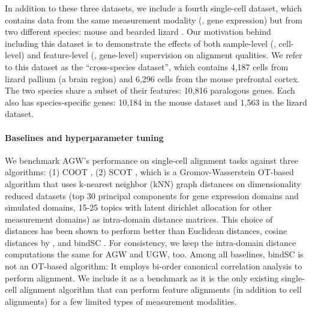 In addition to these three datasets,
we include a fourth single-cell dataset, which contains data from the same measurement modality
(\ie, gene expression) but from two different species: mouse \citep{mouse} and
bearded lizard \citep{lizard}. Our motivation behind including this dataset is
to demonstrate the effects of both sample-level (\ie, cell-level) and
feature-level (\ie, gene-level) supervision on alignment qualities.
We refer to this dataset as the ``cross-species dataset'', which contains 4,187 cells
from lizard pallium (a brain region) and 6,296 cells from the mouse prefrontal cortex.
The two species share a subset of their features: 10,816 paralogous genes.
Each also has species-specific genes: 10,184 in the mouse dataset and 1,563 in the lizard dataset.

\paragraph{Baselines and hyperparameter tuning}
We benchmark AGW's performance on single-cell alignment tasks against three algorithms:
(1) COOT \citep{Redko20}, (2) SCOT \citep{Demetci20}, which is a Gromov-Wasserstein OT-based
algorithm that uses k-nearest neighbor (kNN) graph distances on dimensionality reduced datasets
(top 30 principal components for gene expression domains and simulated domains,
15-25 topics with latent dirichlet allocation for other measurement domains)
as intra-domain distance matrices. This choice of distances has been shown to perform
better than Euclidean distances, cosine distances by \citep{Demetci20}, and bindSC \citep{bindSC}.
For consistency, we keep the intra-domain distance computations the same for AGW and UGW, too.
Among all baselines, bindSC is not an OT-based algorithm: It employs bi-order canonical correlation
analysis to perform alignment. We include it as a benchmark as it is the only existing
single-cell alignment algorithm that can perform feature alignments (in addition to cell alignments)
for a few limited types of measurement modalities.

